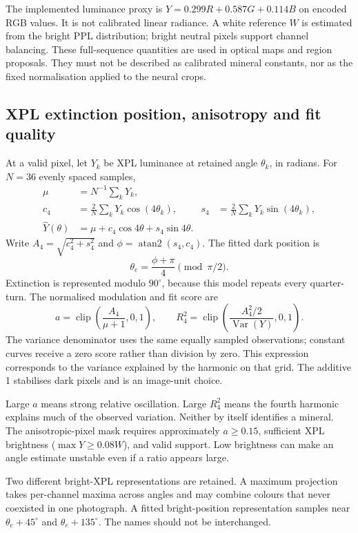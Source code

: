 The implemented luminance proxy is $Y=0.299R+0.587G+0.114B$ on encoded RGB values. It is not calibrated linear radiance. A white reference $W$ is estimated from the bright PPL distribution; bright neutral pixels support channel balancing. These full-sequence quantities are used in optical maps and region proposals. They must not be described as calibrated mineral constants, nor as the fixed normalisation applied to the neural crops.

\subsection{XPL extinction position, anisotropy and fit quality}
At a valid pixel, let $Y_k$ be XPL luminance at retained angle $\theta_k$, in radians. For $N=36$ evenly spaced samples,
\begin{align}
\mu &= N^{-1}\sum_kY_k,\\
c_4 &= \frac{2}{N}\sum_kY_k\cos(4\theta_k), &
s_4 &= \frac{2}{N}\sum_kY_k\sin(4\theta_k),\\
\widehat Y(\theta)&=\mu+c_4\cos4\theta+s_4\sin4\theta.
\end{align}
Write $A_4=\sqrt{c_4^2+s_4^2}$ and $\phi=\operatorname{atan2}(s_4,c_4)$. The fitted dark position is
\begin{equation}
\theta_e=\frac{\phi+\pi}{4}\pmod{\pi/2}.
\end{equation}
Extinction is represented modulo $90^\circ$, because this model repeats every quarter-turn. The normalised modulation and fit score are
\begin{equation}
a=\operatorname{clip}\left(\frac{A_4}{\mu+1},0,1\right),\qquad
R_4^2=\operatorname{clip}\left(\frac{A_4^2/2}{\operatorname{Var}(Y)},0,1\right).
\end{equation}
The variance denominator uses the same equally sampled observations; constant curves receive a zero score rather than division by zero. This expression corresponds to the variance explained by the harmonic on that grid. The additive 1 stabilises dark pixels and is an image-unit choice.

Large $a$ means strong relative oscillation. Large $R_4^2$ means the fourth harmonic explains much of the observed variation. Neither by itself identifies a mineral. The anisotropic-pixel mask requires approximately $a\geq0.15$, sufficient XPL brightness ($\max Y\geq0.08W$), and valid support. Low brightness can make an angle estimate unstable even if a ratio appears large.

Two different bright-XPL representations are retained. A maximum projection takes per-channel maxima across angles and may combine colours that never coexisted in one photograph. A fitted bright-position representation samples near $\theta_e+45^\circ$ and $\theta_e+135^\circ$. The names should not be interchanged.

